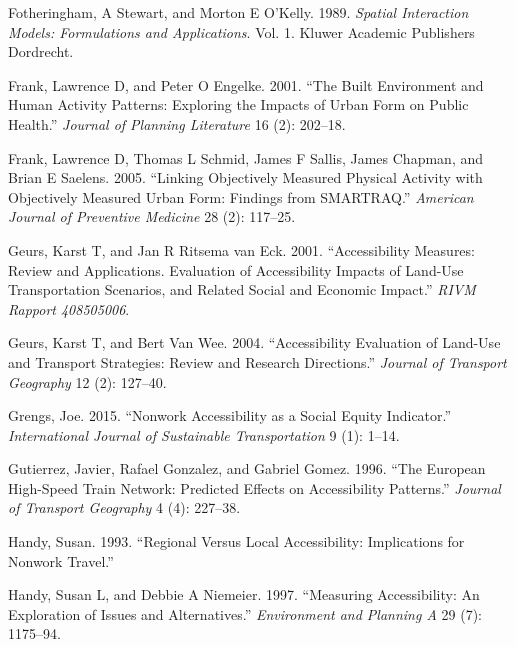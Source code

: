 \documentclass[preprint, 3p,
authoryear]{elsarticle} %
\newlength{\cslhangindent}
\newlength{\cslentryspacingunit} %
\newenvironment{CSLReferences}[2] %
 {%
  \setlength{\parindent}{0pt}
  \ifodd #1
  \let\oldpar\par
  \def\par{\hangindent=\cslhangindent\oldpar}
  \fi
  \setlength{\parskip}{#2\cslentryspacingunit}
 }%
 {}
\begin{document}
\begin{CSLReferences}{1}{0}
\leavevmode{}%
Fotheringham, A Stewart, and Morton E O'Kelly. 1989. \emph{Spatial
Interaction Models: Formulations and Applications}. Vol. 1. Kluwer
Academic Publishers Dordrecht.

\leavevmode{}%
Frank, Lawrence D, and Peter O Engelke. 2001. {``The Built Environment
and Human Activity Patterns: Exploring the Impacts of Urban Form on
Public Health.''} \emph{Journal of Planning Literature} 16 (2): 202--18.

\leavevmode{}%
Frank, Lawrence D, Thomas L Schmid, James F Sallis, James Chapman, and
Brian E Saelens. 2005. {``Linking Objectively Measured Physical Activity
with Objectively Measured Urban Form: Findings from SMARTRAQ.''}
\emph{American Journal of Preventive Medicine} 28 (2): 117--25.

\leavevmode{}%
Geurs, Karst T, and Jan R Ritsema van Eck. 2001. {``Accessibility
Measures: Review and Applications. Evaluation of Accessibility Impacts
of Land-Use Transportation Scenarios, and Related Social and Economic
Impact.''} \emph{RIVM Rapport 408505006}.

\leavevmode{}%
Geurs, Karst T, and Bert Van Wee. 2004. {``Accessibility Evaluation of
Land-Use and Transport Strategies: Review and Research Directions.''}
\emph{Journal of Transport Geography} 12 (2): 127--40.

\leavevmode{}%
Grengs, Joe. 2015. {``Nonwork Accessibility as a Social Equity
Indicator.''} \emph{International Journal of Sustainable Transportation}
9 (1): 1--14.

\leavevmode{}%
Gutierrez, Javier, Rafael Gonzalez, and Gabriel Gomez. 1996. {``The
European High-Speed Train Network: Predicted Effects on Accessibility
Patterns.''} \emph{Journal of Transport Geography} 4 (4): 227--38.

\leavevmode{}%
Handy, Susan. 1993. {``Regional Versus Local Accessibility: Implications
for Nonwork Travel.''}

\leavevmode{}%
Handy, Susan L, and Debbie A Niemeier. 1997. {``Measuring Accessibility:
An Exploration of Issues and Alternatives.''} \emph{Environment and
Planning A} 29 (7): 1175--94.


\end{CSLReferences}
\end{document}
